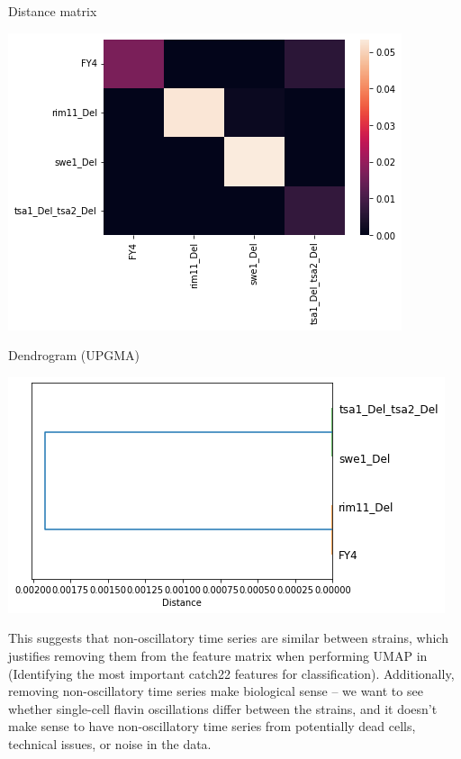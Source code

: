 Distance matrix

\begin{center}
\includegraphics[width=.9\linewidth]{MIHierClust_19979_nosc_distmatrix.png}
\end{center}

Dendrogram (UPGMA)

\begin{center}
\includegraphics[width=.9\linewidth]{MIHierClust_19979_nosc_dendrogram.png}
\end{center}

This suggests that non-oscillatory time series are similar between strains, which justifies removing them from the feature matrix when performing UMAP in (Identifying the most important catch22 features for classification).  Additionally, removing non-oscillatory time series make biological sense -- we want to see whether single-cell flavin oscillations differ between the strains, and it doesn't make sense to have non-oscillatory time series from potentially dead cells, technical issues, or noise in the data.

